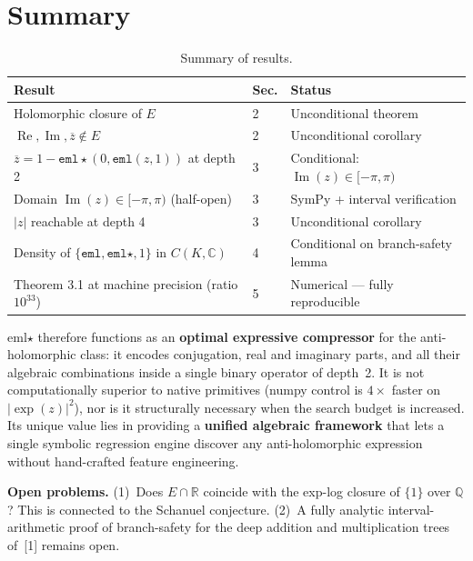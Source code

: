 \documentclass[11pt,a4paper]{article}
\begin{document}
\section{Summary}

\begin{table}[h]
\centering
\begin{tabular}{lll}
\toprule
Result & Sec. & Status \\
\midrule
Holomorphic closure of $E$ & 2 & Unconditional theorem \\
$\operatorname{Re}, \operatorname{Im}, \overline{z} \notin E$ & 2 & Unconditional corollary \\
$\overline{z} = 1 - \texttt{eml}\star(0, \texttt{eml}(z,1))$ at depth 2 & 3 & Conditional: $\operatorname{Im}(z) \in [-\pi, \pi)$ \\
Domain $\operatorname{Im}(z) \in [-\pi, \pi)$ (half-open) & 3 & SymPy + interval verification \\
$|z|$ reachable at depth 4 & 3 & Unconditional corollary \\
Density of $\{\texttt{eml}, \texttt{eml}\star, 1\}$ in $C(K, \mathbb{C})$ & 4 & Conditional on branch-safety lemma \\
Theorem 3.1 at machine precision (ratio $10^{33}$) & 5 & Numerical --- fully reproducible \\
\bottomrule
\end{tabular}
\caption{Summary of results.}
\end{table}

eml$\star$ therefore functions as an \textbf{optimal expressive compressor} for the anti-holomorphic class: it encodes conjugation, real and imaginary parts, and all their algebraic combinations inside a single binary operator of depth~2. It is not computationally superior to native primitives (numpy control is $4\times$ faster on $|\exp(z)|^2$), nor is it structurally necessary when the search budget is increased. Its unique value lies in providing a \textbf{unified algebraic framework} that lets a single symbolic regression engine discover any anti-holomorphic expression without hand-crafted feature engineering.

\textbf{Open problems.} (1)~Does $E \cap \mathbb{R}$ coincide with the exp-log closure of $\{1\}$ over $\mathbb{Q}$? This is connected to the Schanuel conjecture. (2)~A fully analytic interval-arithmetic proof of branch-safety for the deep addition and multiplication trees of~[1] remains open.

\end{document}

